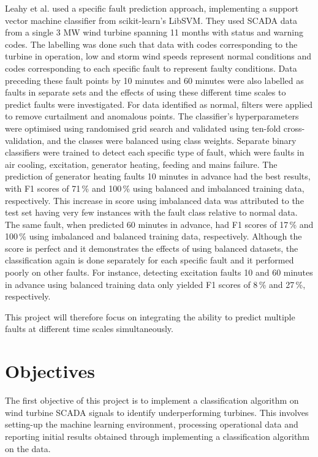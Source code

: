 Leahy et al. \cite{Leahy16} used a specific fault prediction approach,
implementing a support vector machine classifier from scikit-learn's LibSVM.
They used SCADA data from a single 3 MW wind turbine spanning 11 months with
status and warning codes. The labelling was done such that data with codes
corresponding to the turbine in operation, low and storm wind speeds represent
normal conditions and codes corresponding to each specific fault to represent
faulty conditions. Data preceding these fault points by 10 minutes and 60
minutes were also labelled as faults in separate sets and the effects of using
these different time scales to predict faults were investigated. For data
identified as normal, filters were applied to remove curtailment and anomalous
points. The classifier's hyperparameters were optimised using randomised grid
search and validated using ten-fold cross-validation, and the classes were
balanced using class weights. Separate binary classifiers were trained to
detect each specific type of fault, which were faults in air cooling,
excitation, generator heating, feeding and mains failure. The prediction of
generator heating faults 10 minutes in advance had the best results, with F1
scores of 71\,\% and 100\,\% using balanced and imbalanced training data,
respectively. This increase in score using imbalanced data was attributed to
the test set having very few instances with the fault class relative to normal
data. The same fault, when predicted 60 minutes in advance, had F1 scores of
17\,\% and 100\,\% using imbalanced and balanced training data, respectively.
Although the score is perfect and it demonstrates the effects of using
balanced datasets, the classification again is done separately for each
specific fault and it performed poorly on other faults. For instance,
detecting excitation faults 10 and 60 minutes in advance using balanced
training data only yielded F1 scores of 8\,\% and 27\,\%, respectively.

This project will therefore focus on integrating the ability to predict
multiple faults at different time scales simultaneously.

\section{Objectives}

The first objective of this project is to implement a classification algorithm
on wind turbine SCADA signals to identify underperforming turbines. This
involves setting-up the machine learning environment, processing operational
data and reporting initial results obtained through implementing a
classification algorithm on the data.

